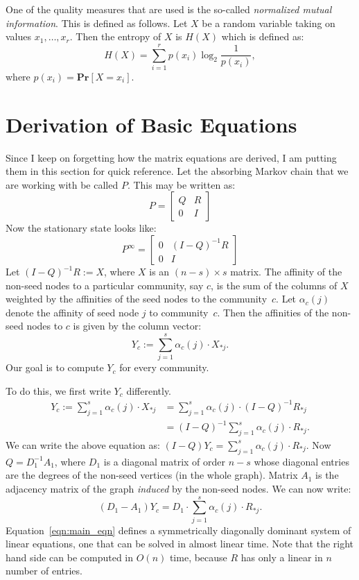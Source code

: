 \documentclass[12pt]{article}
\renewcommand{\Pr}[1]{\ensuremath{\mathbf{Pr} \left [ #1 \right]}}
\begin{document}
One of the quality measures that are used is the so-called \emph{normalized
mutual information}. This is defined as follows. Let $X$ be a random variable 
taking on values $x_1, \ldots, x_r$. Then the entropy of $X$ is $H(X)$ 
which is defined as:
\[
	H(X) = \sum_{i = 1}^r p(x_i) \log_2 \frac{1}{p(x_i)}, 
\]
where $p(x_i) = \Pr{X = x_i}$.

\section{Derivation of Basic Equations}

Since I keep on forgetting how the matrix equations are derived, I am putting 
them in this section for quick reference. Let the absorbing Markov chain 
that we are working with be called $P$. This may be written as:
\[P  = 
\begin{bmatrix}
Q & R \\
0 & I
\end{bmatrix}
\]
Now the stationary state looks like:
\[P^{\infty}  = 
\begin{bmatrix}
0 & (I - Q)^{-1} R \\
0 & I
\end{bmatrix}
\]
Let $(I - Q)^{-1} R := X$, where $X$ is an $(n - s) \times s$ matrix. The affinity 
of the non-seed nodes to a particular community, say $c$, is the sum of the columns 
of $X$ weighted by the affinities of the seed nodes to the community~$c$. Let $\alpha_c(j)$ 
denote the affinity of seed node $j$ to community~$c$. Then the affinities of the non-seed
nodes to $c$ is given by the column vector:
\[
	Y_c := \sum_{j = 1}^{s} \alpha_c(j) \cdot X_{*j}.
\]
Our goal is to compute $Y_c$ for every community. 

To do this, we first write $Y_c$ differently.
\begin{align*}
	Y_c := \sum_{j = 1}^{s} \alpha_c(j) \cdot X_{*j} 
		& = \sum_{j = 1}^{s}\alpha_c(j) \cdot (I - Q)^{-1} R_{*j} \\	
		& = (I - Q)^{-1} \sum_{j = 1}^{s} \alpha_c(j) \cdot R_{*j}.
\end{align*}
We can write the above equation as: $(I - Q)Y_c = \sum_{j = 1}^{s} \alpha_c(j) \cdot R_{*j}$.
Now $Q = D_1^{-1}A_1$, where $D_1$ is a diagonal matrix of order $n - s$ whose diagonal entries 
are the degrees of the non-seed vertices (in the whole graph). Matrix $A_1$ is the adjacency
matrix of the graph \emph{induced} by the non-seed nodes. We can now write:
\begin{equation}\label{eqn:main_eqn}
	(D_1 - A_1) Y_c = D_1 \cdot \sum_{j = 1}^{s} \alpha_c(j) \cdot R_{*j}.
\end{equation}
Equation~\ref{eqn:main_eqn} defines a symmetrically diagonally dominant system 
of linear equations, one that can be solved in almost linear time. Note that 
the right hand side can be computed in $O(n)$ time, because $R$ has only a linear 
in $n$ number of entries. 
\end{document}
